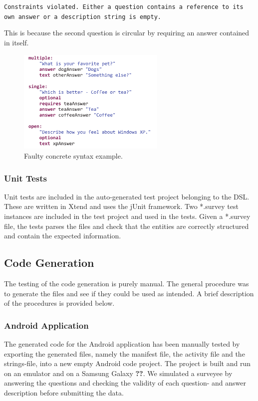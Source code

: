 \documentclass[runningheads]{llncs}
\begin{document}
\noindent
\texttt{Constraints violated. Either a question contains a reference to its own answer or a description string is empty.}

This is because the second question is circular by requiring an answer contained in itself.
\begin{figure}
\centering
\includegraphics[height=5cm]{concretefail}
\caption{Faulty concrete syntax example.}
\label{fig:concretefail}
\end{figure}
\subsubsection{Unit Tests}
Unit tests are included in the auto-generated test project belonging to the DSL. These are written in Xtend and uses the jUnit framework. Two *.survey test instances are included in the test project and used in the tests. Given a *.survey file, the tests parses the files and check that the entities are correctly structured and contain the expected information. 
\subsection{Code Generation}
The testing of the code generation is purely manual. The general procedure was to generate the files and see if they could be used as intended. A brief description of the procedures is provided below.
\subsubsection{Android Application}
The generated code for the Android application has been manually tested by exporting the generated files, namely the manifest file, the activity file and the strings-file, into a new empty Android code project. The project is built and run on an emulator and on a Samsung Galaxy \textbf{??}. We simulated a surveyee by answering the questions and checking the validity of each question- and answer description before submitting the data.
\end{document}

